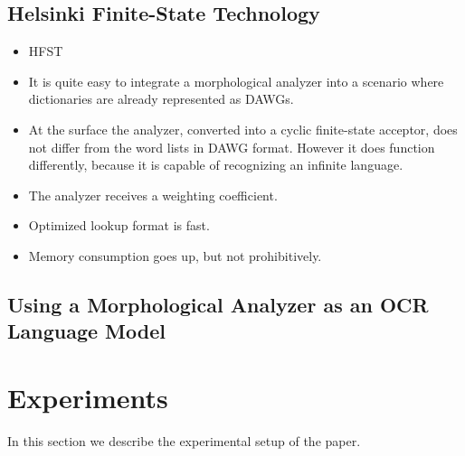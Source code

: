 \documentclass[b5paper]{article}
\begin{document}
\subsection{Helsinki Finite-State Technology}
\begin{itemize}
\item HFST \cite{linden13}
\item It is quite easy to integrate a morphological analyzer into a
  scenario where dictionaries are already represented as DAWGs.
\item At the surface the analyzer, converted into a cyclic
  finite-state acceptor, does not differ from the word lists in DAWG
  format. However it does function differently, because it is capable
  of recognizing an infinite language.
\item The analyzer receives a weighting coefficient.
\item Optimized lookup format is fast.
\item Memory consumption goes up, but not prohibitively.
\end{itemize}

\subsection{Using a Morphological Analyzer as an OCR Language Model}

\section{Experiments}

%
%
%
%
%
In this section we describe the experimental setup of the paper.
\end{document}
